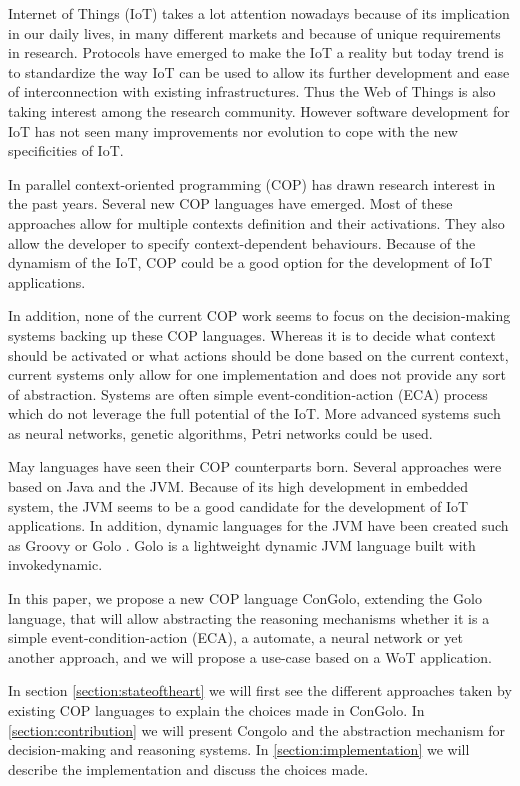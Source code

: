 \documentclass[a4paper]{article}
\begin{document}
Internet of Things (IoT) takes a lot attention nowadays because of its implication in our daily lives, in many different markets and because of unique requirements in research. Protocols have emerged to make the IoT a reality but today trend is to standardize the way IoT can be used to allow its further development and ease of interconnection with existing infrastructures. Thus the Web of Things is also taking interest among the research community. However software development for IoT has not seen many improvements nor evolution to cope with the new specificities of IoT. 

In parallel context-oriented programming (COP) has drawn research interest in the past years. Several new COP languages have emerged. Most of these approaches allow for multiple contexts definition and their activations. They also allow the developer to specify context-dependent behaviours. Because of the dynamism of the IoT, COP could be a good option for the development of IoT applications.

In addition, none of the current COP work seems to focus on the decision-making systems backing up these COP languages. Whereas it is to decide what context should be activated or what actions should be done based on the current context, current systems only allow for one implementation and does not provide any sort of abstraction. Systems are often simple event-condition-action (ECA) process which do not leverage the full potential of the IoT. More advanced systems such as neural networks, genetic algorithms, Petri networks could be used.


May languages have seen their COP counterparts born. Several approaches were based on Java and the JVM. Because of its high development in embedded system, the JVM seems to be a good candidate for the development of IoT applications. In addition, dynamic languages for the JVM have been created such as Groovy or Golo \cite{ponge_golo_2013}. Golo is a lightweight dynamic JVM language built with invokedynamic.

In this paper, we propose a new COP language ConGolo, extending the Golo language, that will allow abstracting the reasoning mechanisms whether it is a simple event-condition-action (ECA), a automate, a neural network or yet another approach, and we will propose a use-case based on a WoT application.


In section \ref{section:stateoftheart} we will first see the different approaches taken by existing COP languages to explain the choices made in ConGolo. In \ref{section:contribution} we will present Congolo and the abstraction mechanism for decision-making and reasoning systems. In \ref{section:implementation} we will describe the implementation and discuss the choices made.
\end{document}
